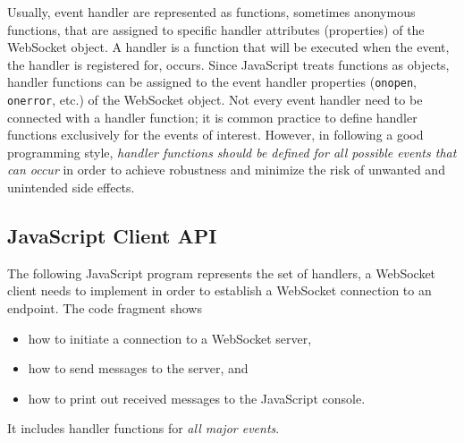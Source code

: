 \documentclass[a4paper, justified, notoc]{tufte-handout} %
\begin{document}
Usually, event handler are represented as functions, sometimes anonymous functions, that are assigned to specific handler attributes (properties) of the WebSocket object. A handler is a function that will be executed when the event, the handler is registered for, occurs. Since JavaScript treats functions as objects, handler functions can be assigned to the event handler properties (\texttt{onopen}, \texttt{onerror}, etc.) of the WebSocket object.
Not every event handler need to be connected with a handler function; it is common practice to define handler functions exclusively for the events of interest. 
However, in following a good programming style, \emph{handler functions should be defined for all possible events that can occur} in order to achieve robustness and minimize the risk of unwanted and unintended side effects. 

\subsection{JavaScript Client API} %
\label{sub:simple_websocket_client_program}
The following JavaScript program represents the set of handlers, a WebSocket client needs to implement in order to establish a WebSocket connection to an endpoint. The code fragment shows 
\begin{itemize}
	\item how to initiate a connection to a WebSocket server,
	\item how to send messages to the server, and 
	\item how to print out received messages to the JavaScript console.
\end{itemize}  It includes handler functions for \emph{all major events}.
\end{document}
